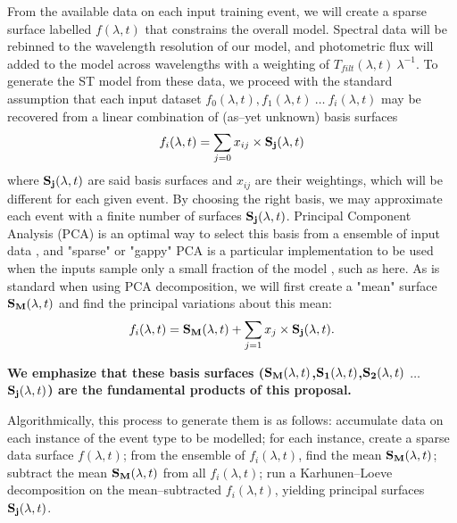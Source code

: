 From the available data on each input training event, we will create a sparse
surface labelled $f(\lambda, t)$ that constrains the overall model.  Spectral
data will be rebinned to the wavelength resolution of our model, and photometric
flux will added to the model across wavelengths with a weighting of
$T_{filt}(\lambda, t)~\lambda^{-1}$.  To generate the ST model from these data,
we proceed with the standard assumption that each input dataset $f_0(\lambda,
t), f_1(\lambda, t)~\ldots~f_i(\lambda, t)$ may be recovered from a linear
combination of (as--yet unknown) basis surfaces $$f_i(\lambda, t) = \sum_{j=0}
x_{ij} \times {\bf S_j}(\lambda, t)$$ where ${\bf S_j}(\lambda, t)$ are said
basis surfaces and $x_{ij}$ are their weightings, which will be different for
each given event.  By choosing the right basis, we may approximate each event
with a finite number of surfaces ${\bf S_j}(\lambda, t)$. Principal Component
Analysis (PCA) is an optimal way to select this basis from a ensemble of input
data \cite[e.g.][for astrophysical application to galaxy
spectra]{1995AJ....110.1071C}, and "sparse" or "gappy" PCA is a particular
implementation to be used when the inputs sample only a small fraction of the
model \citep{zouht04}, such as here.  As is standard when using PCA
decomposition, we will first create a "mean" surface ${\bf S_M}(\lambda, t)$ and
find the principal variations about this mean: $$f_i(\lambda, t) = {\bf
S_M}(\lambda, t) + \sum_{j=1} x_j \times {\bf S_j}(\lambda, t).$$

\begin{center} {\bf We emphasize that these basis surfaces (${\bf S_M}(\lambda,
t)$,${\bf S_1}(\lambda, t)$,${\bf S_2}(\lambda, t)$ $\ldots$ ${\bf S_j}(\lambda,
t)$) are the fundamental products of this proposal.} \end{center}

Algorithmically, this process to generate them is as follows: accumulate data on
each instance of the event type to be modelled; for each instance, create a
sparse data surface $f(\lambda, t)$; from the ensemble of $f_i(\lambda, t)$,
find the mean ${\bf S_M}(\lambda, t)$; subtract the mean ${\bf S_M}(\lambda, t)$
from all $f_i(\lambda, t)$; run a Karhunen--Loeve decomposition
\citep{Karhunen:47,Loeve:48} on the mean--subtracted $f_i(\lambda, t)$, yielding
principal surfaces ${\bf S_j}(\lambda, t)$.

